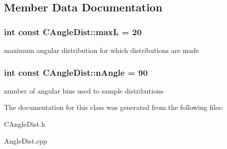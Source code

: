 \subsection{Member Data Documentation}
\subsubsection{\setlength{\rightskip}{0pt plus 5cm}int const \bf{CAngle\-Dist::max\-L} = 20\hspace{0.3cm}{\tt  [static, protected]}}\label{classCAngleDist_3f0aa16d55e7c170d294c19c8d144d14}


maximum angular distribution for which distributions are made 
\subsubsection{\setlength{\rightskip}{0pt plus 5cm}int const \bf{CAngle\-Dist::n\-Angle} = 90\hspace{0.3cm}{\tt  [static, protected]}}\label{classCAngleDist_781df82a35c54b698d8650d7524ccb8e}


number of angular bins used to sample distributions 

The documentation for this class was generated from the following files:\begin{CompactItemize}
\item 
CAngle\-Dist.h\item 
Angle\-Dist.cpp\end{CompactItemize}
